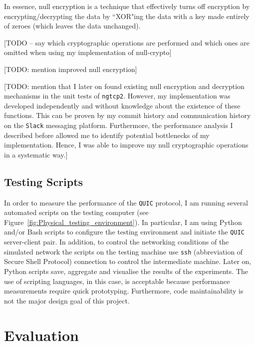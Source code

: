 \documentclass[12pt,a4paper,twoside,openright]{report}
\begin{document}
In essence, null encryption is a technique that effectively turns off encryption by encrypting/decrypting the data by ``XOR"ing the data with a key made entirely of zeroes (which leaves the data unchanged). 

[TODO -- say which cryptographic operations are performed and which ones are omitted when using my implementation of null-crypto]


[TODO: mention improved null encryption]

[TODO: mention that I later on found existing null encryption and decryption mechanisms in the unit tests of \texttt{ngtcp2}. 
However, my implementation was developed independently and without knowledge about the existence of these functions.
This can be proven by my commit history and communication history on the \texttt{Slack} messaging platform.
Furthermore, the performance analysis I described before allowed me to identify potential bottlenecks of my implementation.
Hence, I was able to improve my null cryptographic operations in a systematic way.]





\section{Testing Scripts}

In order to measure the performance of the \texttt{QUIC} protocol, I am running several automated scripts on the testing computer (see Figure~\ref{fig:Physical_testing_environment}).
In particular, I am using Python and/or Bash scripts to configure the testing environment and initiate the \texttt{QUIC} server-client pair.
In addition, to control the networking conditions of the simulated network the scripts on the testing machine use \texttt{ssh} (abbreviation of Secure Shell Protocol) connection to control the intermediate machine.
Later on, Python scripts save, aggregate and visualise the results of the experiments.
The use of scripting languages, in this case, is acceptable because performance measurements require quick prototyping.
Furthermore, code maintainability is not the major design goal of this project.






\chapter{Evaluation}
\end{document}
